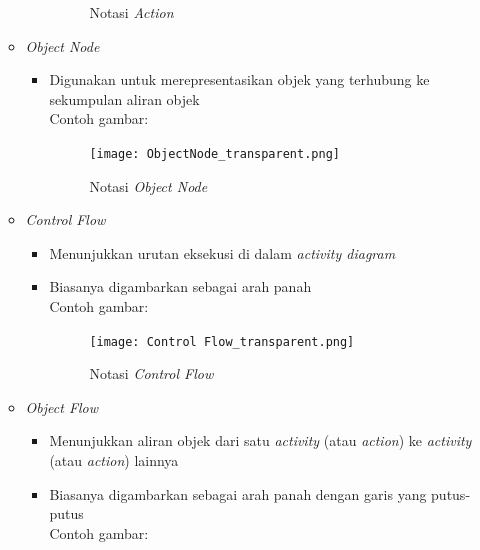 \documentclass[a4paper]{article}
\begin{document}
\begin{enumerate}
\begin{itemize}
\begin{itemize}
\begin{figure}[h]
                    \caption{Notasi \textit{Action}}
                  \end{figure}
        \end{itemize}
        \item \textit{Object Node}
        \begin{itemize}
            \item Digunakan untuk merepresentasikan objek yang terhubung ke sekumpulan aliran objek\autocite{systemanalysisdesign-activity-diagram}\\
                  Contoh gambar:\\
                  \begin{figure}[h]
                    \centering
                    \texttt{[image: ObjectNode\_transparent.png]}
                    \caption{Notasi \textit{Object Node}}
                  \end{figure}
        \end{itemize}
        \item \textit{Control Flow}
        \begin{itemize}
            \item Menunjukkan urutan eksekusi di dalam \textit{activity diagram}
            \item Biasanya digambarkan sebagai arah panah\autocite{systemanalysisdesign-activity-diagram}\\
                  Contoh gambar:\\
                  \begin{figure}[h]
                    \centering
                    \texttt{[image: Control Flow\_transparent.png]}
                    \caption{Notasi \textit{Control Flow}}
                  \end{figure}
        \end{itemize}
        \item \textit{Object Flow}
        \begin{itemize}
            \item Menunjukkan aliran objek dari satu \textit{activity} (atau \textit{action}) ke \textit{activity} (atau \textit{action}) lainnya
            \item Biasanya digambarkan sebagai arah panah dengan garis yang putus-putus\autocite{systemanalysisdesign-activity-diagram}\\
                  Contoh gambar:\\
                  \begin{figure}[h]
                    \centering

\end{figure}
\end{itemize}
\end{itemize}
\end{enumerate}
\end{document}
